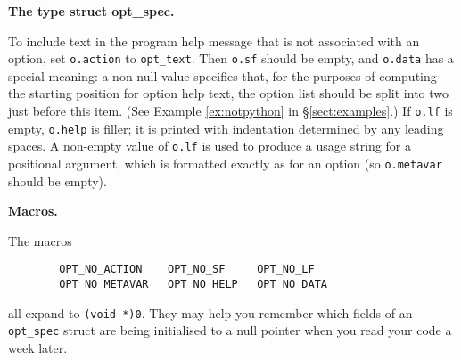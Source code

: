 \documentclass{article}
\newenvironment{chunk}[1]
{\par\smallskip\noindent\textbf{#1.}\par\nopagebreak}
{\par\smallskip}
\renewcommand{\tt}{\texttt}
\begin{document}
\begin{chunk}{The type struct opt\_spec}
  To include text in the program help message that is not associated with an
  option, set \tt{o.action} to \tt{opt\_text}. Then \tt{o.sf} should
  be empty, and \tt{o.data} has a special meaning: a non-null value
  specifies that, for the purposes of computing the starting position
  for option help text, the option list should be split into two just
  before this item. (See Example \ref{ex:notpython} in
  \S\ref{sect:examples}.) If \tt{o.lf} is empty, \tt{o.help} is filler;
  it is printed with indentation determined by any leading spaces. A
  non-empty value of \tt{o.lf} is used to produce a usage string for a
  positional argument, which is formatted exactly as for an option (so
  \tt{o.metavar} should be empty).
\end{chunk}
\begin{chunk}{Macros}
  The macros
\begin{verbatim}
        OPT_NO_ACTION    OPT_NO_SF     OPT_NO_LF
        OPT_NO_METAVAR   OPT_NO_HELP   OPT_NO_DATA
\end{verbatim}
  all expand to \tt{(void *)0}. They may help you remember which
  fields of an \tt{opt\_spec} struct are being initialised to a
  null pointer when you read your code a week later. 
\end{chunk}
\end{document}
